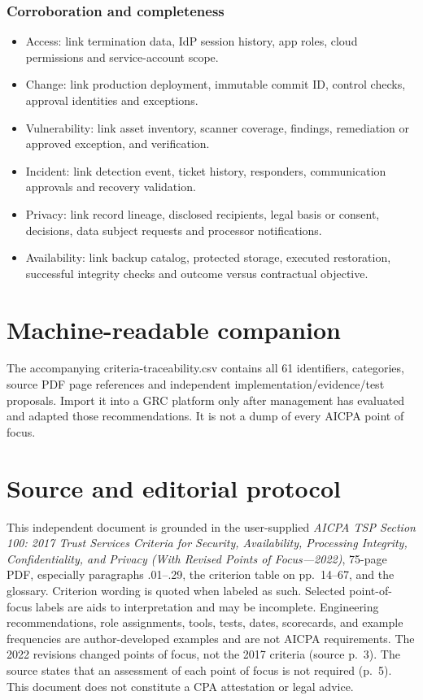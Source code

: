 \documentclass[10pt,oneside]{report}
\begin{document}
\subsection{Corroboration and completeness}
\begin{itemize}
\item Access: link termination data, IdP session history, app roles, cloud permissions and service-account scope.
\item Change: link production deployment, immutable commit ID, control checks, approval identities and exceptions.
\item Vulnerability: link asset inventory, scanner coverage, findings, remediation or approved exception, and verification.
\item Incident: link detection event, ticket history, responders, communication approvals and recovery validation.
\item Privacy: link record lineage, disclosed recipients, legal basis or consent, decisions, data subject requests and processor notifications.
\item Availability: link backup catalog, protected storage, executed restoration, successful integrity checks and outcome versus contractual objective.
\end{itemize}

\chapter{Machine-readable companion}
The accompanying criteria-traceability.csv contains all 61 identifiers, categories, source PDF page references and independent implementation/evidence/test proposals. Import it into a GRC platform only after management has evaluated and adapted those recommendations. It is not a dump of every AICPA point of focus.


\chapter*{Source and editorial protocol}
This independent document is grounded in the user-supplied \emph{AICPA TSP Section 100: 2017 Trust Services Criteria for Security, Availability, Processing Integrity, Confidentiality, and Privacy (With Revised Points of Focus---2022)}, 75-page PDF, especially paragraphs .01--.29, the criterion table on pp.~14--67, and the glossary. Criterion wording is quoted when labeled as such. Selected point-of-focus labels are aids to interpretation and may be incomplete. Engineering recommendations, role assignments, tools, tests, dates, scorecards, and example frequencies are author-developed examples and are not AICPA requirements. The 2022 revisions changed points of focus, not the 2017 criteria (source p.~3). The source states that an assessment of each point of focus is not required (p.~5). This document does not constitute a CPA attestation or legal advice.
\end{document}
